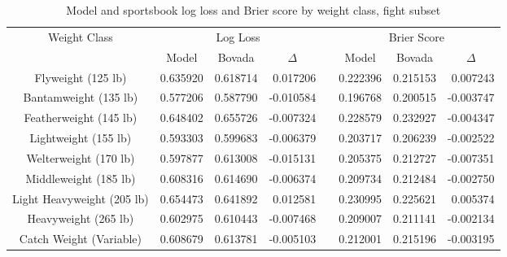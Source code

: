 \documentclass[12pt,twoside]{report}
\begin{document}
\begin{table}[!htb]
\footnotesize
\centering
\begin{tabular}{@{}cccrlccr@{}}
\toprule
\multirow{2}{*}{Weight Class}  & \multicolumn{3}{c}{Log Loss}                       & \multicolumn{1}{c}{\multirow{2}{*}{}} & \multicolumn{3}{c}{Brier Score}                    \\ \cmidrule(lr){2-4} \cmidrule(l){6-8} 
                               & Model    & Bovada   & \multicolumn{1}{c}{$\Delta$} & \multicolumn{1}{c}{}                  & Model    & Bovada   & \multicolumn{1}{c}{$\Delta$} \\ \midrule
Flyweight (125 lb)             & 0.635920 & 0.618714 & 0.017206                     & \multicolumn{1}{c}{}                  & 0.222396 & 0.215153 & 0.007243                     \\
Bantamweight (135 lb)          & 0.577206 & 0.587790 & -0.010584                    &                                       & 0.196768 & 0.200515 & -0.003747                    \\
Featherweight (145 lb)         & 0.648402 & 0.655726 & -0.007324                    &                                       & 0.228579 & 0.232927 & -0.004347                    \\
Lightweight (155 lb)           & 0.593303 & 0.599683 & -0.006379                    &                                       & 0.203717 & 0.206239 & -0.002522                    \\
Welterweight (170 lb)          & 0.597877 & 0.613008 & -0.015131                    &                                       & 0.205375 & 0.212727 & -0.007351                    \\
Middleweight (185 lb)          & 0.608316 & 0.614690 & -0.006374                     &                                       & 0.209734 & 0.212484 & -0.002750                     \\
Light Heavyweight (205 lb)     & 0.654473 & 0.641892 & 0.012581                     &                                       & 0.230995 & 0.225621 & 0.005374                     \\
Heavyweight (265 lb)           & 0.602975 & 0.610443 & -0.007468                    &                                       & 0.209007 & 0.211141 & -0.002134                     \\
Catch Weight (Variable)        & 0.608679 & 0.613781 & -0.005103                    & \multicolumn{1}{c}{}                  & 0.212001 & 0.215196 & -0.003195                    \\ \bottomrule
\end{tabular}
\caption{Model and sportsbook log loss and Brier score by weight class, fight subset}
\end{table}
\normalsize
\end{document}
